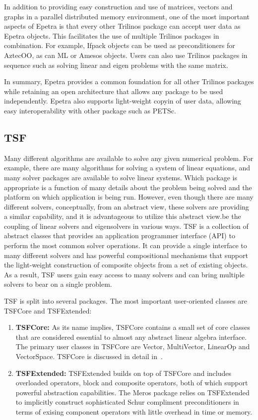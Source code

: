 \documentclass[12pt,strict]{TrilinosDevGuide}
\begin{document}
In addition to providing easy construction and use of matrices,
vectors and graphs in a parallel distributed memory environment,
one of the most important aspects of Epetra is that every other
Trilinos package can accept user data as Epetra objects.  This
facilitates the use of multiple Trilinos packages in combination.  For
example, Ifpack objects can be used as preconditioners for AztecOO, as
can ML or Amesos objects.  Users can also use Trilinos packages in
sequence such as solving linear and eigen problems with the same
matrix.

In summary, Epetra provides a common foundation for all other Trilinos
packages while retaining an open architecture that allows any package
to be used independently.  Epetra also supports light-weight copyin of
user data, allowing easy interoperability with other package such as
PETSc.

\subsection{TSF}
\label{subsect:InteropTSF}
Many different algorithms are available to solve any given numerical
problem.  For example, there are many algorithms for solving a system
of linear equations, and many solver packages are available to solve
linear systems.  Which package is appropriate is a function of
many details about the problem being solved and the platform on which
application is being run. However, even though
there are many different solvers, conceptually, from an abstract view,
these solvers are providing a similar capability, and it is
advantageous to utilize this abstract view.be the coupling of
linear solvers and eigensolvers in various ways.
TSF is a collection of abstract classes that provides an application
programmer interface (API) to perform the most common solver
operations.  It can provide a single interface to many different
solvers and has powerful compositional mechanisms that support the
light-weight construction of composite objects from a set of
existing objects.  As a result, TSF users gain easy access to many
solvers and can bring multiple solvers to bear on a single problem.

TSF is split into several packages.  The most important user-oriented
classes are TSFCore and TSFExtended:
\begin{enumerate}
\item {\bf TSFCore:} As its name implies, TSFCore contains a small set
of core classes that are considered essential to almost any abstract
linear algebra interface.  The primary user classes in TSFCore are
Vector, MultiVector, LinearOp and VectorSpace. TSFCore is discussed in
detail in~\cite{TSFCore}.
\item {\bf TSFExtended:} TSFExtended builds on top of TSFCore and
includes overloaded operators, block and composite operators, both of
which support powerful abstraction capabilities.  The Meros package
relies on TSFExtended to implicitly construct sophisticated
Schur compliment preconditioners in terms of exising component
operators with little overhead in time or memory.
\end{enumerate}
\end{document}
